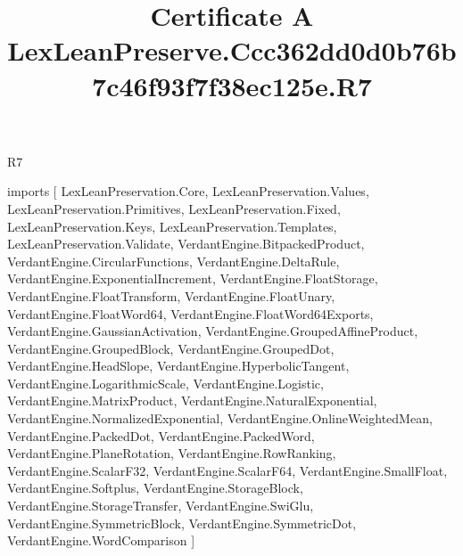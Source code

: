 \begin{lexlean}{R7}
\title{Certificate A LexLeanPreserve.Ccc362dd0d0b76b7c46f93f7f38ec125e.R7}
\begin{coremodule}
imports [
  LexLeanPreservation.Core,
  LexLeanPreservation.Values,
  LexLeanPreservation.Primitives,
  LexLeanPreservation.Fixed,
  LexLeanPreservation.Keys,
  LexLeanPreservation.Templates,
  LexLeanPreservation.Validate,
  VerdantEngine.BitpackedProduct,
  VerdantEngine.CircularFunctions,
  VerdantEngine.DeltaRule,
  VerdantEngine.ExponentialIncrement,
  VerdantEngine.FloatStorage,
  VerdantEngine.FloatTransform,
  VerdantEngine.FloatUnary,
  VerdantEngine.FloatWord64,
  VerdantEngine.FloatWord64Exports,
  VerdantEngine.GaussianActivation,
  VerdantEngine.GroupedAffineProduct,
  VerdantEngine.GroupedBlock,
  VerdantEngine.GroupedDot,
  VerdantEngine.HeadSlope,
  VerdantEngine.HyperbolicTangent,
  VerdantEngine.LogarithmicScale,
  VerdantEngine.Logistic,
  VerdantEngine.MatrixProduct,
  VerdantEngine.NaturalExponential,
  VerdantEngine.NormalizedExponential,
  VerdantEngine.OnlineWeightedMean,
  VerdantEngine.PackedDot,
  VerdantEngine.PackedWord,
  VerdantEngine.PlaneRotation,
  VerdantEngine.RowRanking,
  VerdantEngine.ScalarF32,
  VerdantEngine.ScalarF64,
  VerdantEngine.SmallFloat,
  VerdantEngine.Softplus,
  VerdantEngine.StorageBlock,
  VerdantEngine.StorageTransfer,
  VerdantEngine.SwiGlu,
  VerdantEngine.SymmetricBlock,
  VerdantEngine.SymmetricDot,
  VerdantEngine.WordComparison
]


\end{coremodule}
\end{lexlean}
